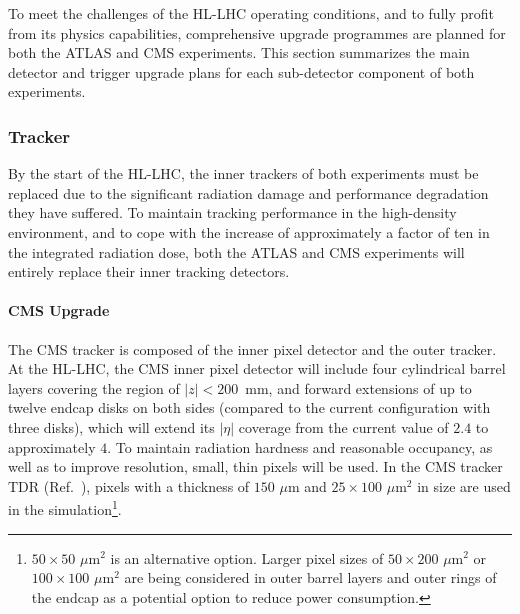 To meet the challenges of the HL-LHC operating conditions, and to fully profit from its physics capabilities, comprehensive upgrade programmes are planned for both the ATLAS and CMS experiments. This section summarizes the main detector and trigger upgrade plans for each sub-detector component of both experiments. 


\subsubsection{Tracker} \label{sec:upgradetracker}

By the start of the HL-LHC, the inner trackers of both experiments must be replaced due to the significant radiation damage and performance degradation they have suffered. 
To maintain tracking performance in
the high-density environment, and to cope with the increase of approximately a factor
of ten in the integrated radiation dose, both the ATLAS and CMS experiments will entirely replace their inner tracking detectors.  

\paragraph{CMS Upgrade} 
The CMS tracker is composed of the inner pixel detector and the outer tracker. 
At the HL-LHC, the CMS inner pixel detector will include four cylindrical barrel layers covering the region of $ |z|<200$~mm, and forward extensions of up to twelve endcap disks on both sides (compared to the current configuration with three disks),
which will extend its $|\eta|$ coverage from the current value of $2.4$ to approximately $4$. To maintain radiation hardness and reasonable occupancy, as well as to improve resolution, small, thin pixels will be used. In the CMS tracker TDR (Ref.~\cite{Collaboration:2272264}), pixels with a thickness of $150\,\, \mu \mathrm{m}$ and $25\times100\,\,{\mu \mathrm{m}}^2$ in size are used in the simulation\footnote{$50\times50\,\,{\mu \mathrm{m}}^2$ is an alternative option. Larger pixel sizes of $50\times200\,\,{\mu \mathrm{m}}^2$ or $100\times100\,\,{\mu \mathrm{m}}^2$ are being considered in outer barrel layers and outer rings of the endcap as a potential option to reduce power consumption.}.

